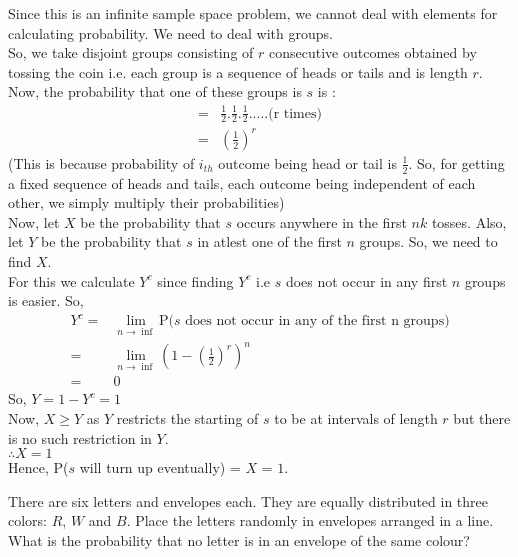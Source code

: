 \documentclass[12pt]{article}
\begin{document}
    \begin{solution}
        Since this is an infinite sample space problem, we cannot deal with elements for calculating probability. We need to deal with groups.\\
        So, we take disjoint groups consisting of $r$ consecutive outcomes obtained by tossing the coin i.e. each group is a sequence of heads or tails and is length $r$.\\
        Now, the probability that one of these groups is $s$ is :
        \begin{align*}
            = & \frac{1}{2}.\frac{1}{2}.\frac{1}{2}.....\text{(r times)}\\
            = & (\frac{1}{2})^r
        \end{align*}
        (This is because probability of $i_{th}$ outcome being head or tail is $\frac{1}{2}$. So, for getting a fixed sequence of heads and tails, each outcome being independent of each other, we simply multiply their probabilities)\\
        Now, let $X$ be the probability that $s$ occurs anywhere in the first $nk$ tosses.
        Also, let $Y$ be the probability that $s$ in atlest one of the first $n$ groups. So, we need to find $X$. \\For this we calculate $Y^c$ since finding $Y^c$ i.e $s$ does not occur in any first $n$ groups is easier. So,
        \begin{align*}
            Y^c = &\lim_{n \to \inf}\text{P($s$ does not occur in any of the first n groups)}\\
            = &\lim_{n \to \inf}(1-(\frac{1}{2})^r)^n\\
            = &0
        \end{align*}
        So, $Y=1-Y^c=1$\\
        Now, $X\ge Y$ as $Y$ restricts the starting of $s$ to be at intervals of length $r$ but there is no such restriction in $Y$.\\
        $\therefore X = 1$\\
        Hence, P($s$ will turn up eventually) = $X$ = $1$.
    \end{solution}

    \begin{question}
        There are six letters and envelopes each. They are equally distributed in three colors: $R$, $W$ and $B$. Place the letters randomly in envelopes arranged in a line. What is the probability that no letter is in an envelope of the same colour?
    \end{question}
\end{document}
